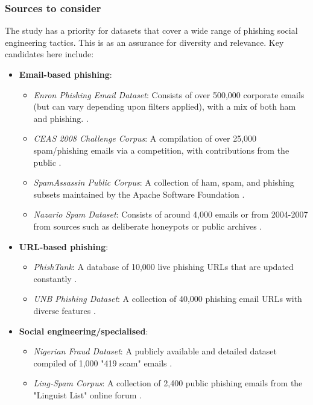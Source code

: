 
\subsubsection*{Sources to consider}
The study has a priority for datasets that cover a wide range of phishing social engineering tactics. This is as an assurance for diversity and relevance. Key candidates here include:

\begin{itemize}
  \item \textbf{Email-based phishing}:
  \begin{itemize}
    \item \textit{Enron Phishing Email Dataset}: Consists of over 500,000 corporate emails (but can vary depending upon filters applied), with a mix of both ham and phishing. \citep{klimt2004enron}.
    \item \textit{CEAS 2008 Challenge Corpus}: A compilation of over 25,000 spam/phishing emails via a competition, with contributions from the public \citep{cormack2008email}.
    \item \textit{SpamAssassin Public Corpus}: A collection of ham, spam, and phishing subsets maintained by the Apache Software Foundation \citep{spamassassin2003}.
    \item \textit{Nazario Spam Dataset}: Consists of around 4,000 emails or from 2004-2007 from sources such as deliberate honeypots or public archives \citep{nazario2007phishing}.
  \end{itemize}
\item \textbf{URL-based phishing}:
\begin{itemize}
  \item \textit{PhishTank}: A database of 10,000 live phishing URLs that are updated constantly \citep{phishTank2023}.
  \item \textit{UNB Phishing Dataset}: A collection of 40,000 phishing email URLs with diverse features \citep{unb2016phishing}.
\end{itemize}
\item \textbf{Social engineering/specialised}:
  \begin{itemize}
    \item \textit{Nigerian Fraud Dataset}: A publicly available and detailed dataset compiled of 1,000 "419 scam" emails \citep{champa2024phishing}.
    \item \textit{Ling-Spam Corpus}: A collection of 2,400 public phishing emails from the "Linguist List" online forum \citep{ling2005spam}.
  \end{itemize}
\end{itemize}

